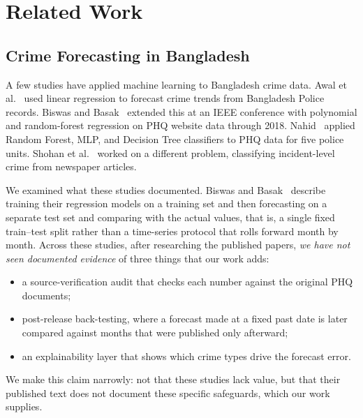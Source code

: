 \documentclass[conference]{IEEEtran}
\begin{document}
\section{Related Work}
\subsection{Crime Forecasting in Bangladesh}
A few studies have applied machine learning to Bangladesh crime data. Awal et al.~\cite{awal2016}
used linear regression to forecast crime trends from Bangladesh Police records. Biswas and
Basak~\cite{biswas2019} extended this at an IEEE conference with polynomial and random-forest
regression on PHQ website data through 2018. Nahid~\cite{nahid2021} applied Random Forest, MLP,
and Decision Tree classifiers to PHQ data for five police units. Shohan et al.~\cite{shohan2022}
worked on a different problem, classifying incident-level crime from newspaper articles.

We examined what these studies documented. Biswas and Basak~\cite{biswas2019} describe
training their regression models on a training set and then forecasting on a separate test set
and comparing with the actual values, that is, a single fixed train--test split rather than a
time-series protocol that rolls forward month by month. Across these studies, after researching
the published papers, \emph{we have not seen documented evidence} of three things that our work
adds:
\begin{itemize}
  \item a source-verification audit that checks each number against the original PHQ documents;
  \item post-release back-testing, where a forecast made at a fixed past date is later compared
        against months that were published only afterward;
  \item an explainability layer that shows which crime types drive the forecast error.
\end{itemize}
We make this claim narrowly: not that these studies lack value, but that their published text does
not document these specific safeguards, which our work supplies.
\end{document}
